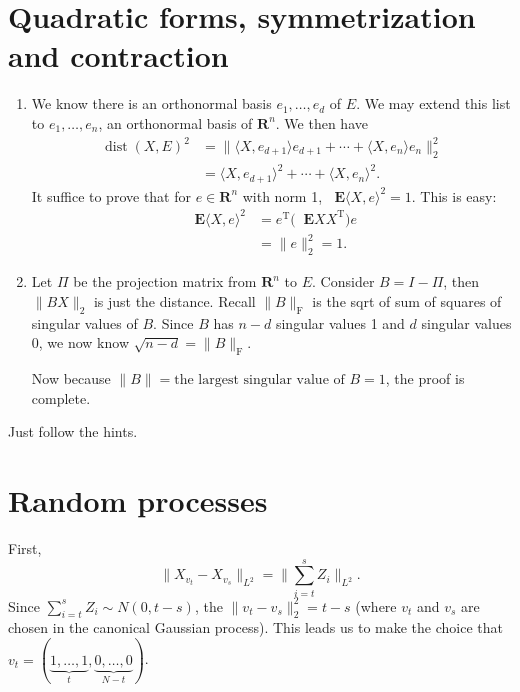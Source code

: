 \documentclass[11pt]{article}
\newcommand{\R}{\mathbf{R}}
\newcommand{\inp}[2]{\langle #1, #2 \rangle}
\newcommand{\nm}[1]{\lVert #1 \rVert}
\newcommand{\trp}{\mathrm T}
\newcommand{\E}{\mathop{}\!\mathbf{E}}
\theoremstyle{plain}
\theoremstyle{definition}
\theoremstyle{remark}
\theoremstyle{definition}
\newenvironment{mansol}[1]{%
  \renewcommand\themansolinner{#1}%
  \mansolinner
}{\endmansolinner}
\begin{document}
\newpage
\section{Quadratic forms, symmetrization and contraction}
\begin{mansol}{6.3.4}
    \begin{enumerate}[label=(\alph*)]
        \item We know there is an orthonormal basis $e_1,\ldots,e_d$ of $E$. We may extend this list to $e_1,\ldots,e_n$, an orthonormal basis of $\R^n$. We then have \begin{align*}
        \operatorname{dist}(X,E)^2 & = \nm{\inp{X}{e_{d+1}}e_{d+1} + \cdots + \inp{X}{e_n}e_n}_2^2 \\ & = \inp{X}{e_{d+1}}^2 + \cdots + \inp{X}{e_n}^2.
        \end{align*}
    It suffice to prove that for $e \in \R^n$ with norm 1, $\E \inp{X}{e}^2 = 1$. This is easy: 
    \begin{align*}
        \E \inp{X}{e}^2 & = e^\trp \bigl(\E X X^\trp\bigr) e \\ & = \nm{e}_2^2 = 1.
    \end{align*}
    \item Let $\Pi$ be the projection matrix from $\R^n$ to $E$. Consider $B = I - \Pi$, then $\nm{BX}_2$ is just the distance. Recall $\nm{B}_{\mathrm F}$ is the sqrt of sum of squares of singular values of $B$. Since $B$ has $n - d$ singular values 1 and $d$ singular values 0, we now know $\sqrt{n-d} = \nm{B}_{\mathrm F}$.

    Now because $\nm{B} = \text{the largest singular value of }B = 1$, the proof is complete.
    \end{enumerate}
\end{mansol}

\begin{mansol}{6.5.2}
    Just follow the hints. %
\end{mansol}

\newpage
\section{Random processes}
\begin{mansol}{7.1.13}
    First, \[\nm{X_{v_t} - X_{v_s}}_{L^2} = \Big\lVert\sum_{i=t}^s Z_i\Big\rVert_{L^2}.\] Since $\sum_{i=t}^s Z_i \sim N(0,t-s)$, the $\nm{v_t-v_s}_2^2 = t-s$ (where $v_t$ and $v_s$ are chosen in the canonical Gaussian process). This leads us to make the choice that $v_t = (\underbrace{1,\ldots,1}_{t},\underbrace{0,\ldots,0}_{N-t})$.
\end{mansol}
\end{document}
